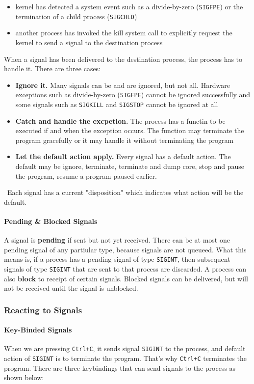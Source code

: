 \documentclass{article}
\newcommand{\bold}[1]{\textbf{#1}}
\renewcommand{\b}{\item[$\circ$]}
\newcommand{\newlist}{\begin{itemize}}
\renewcommand{\endlist}{\end{itemize}}
\newcommand{\code}[1]{\texttt{#1}}
\begin{document}
\newlist
\b kernel has detected a system event such as a divide-by-zero (\code{SIGFPE}) or the termination of a child process (\code{SIGCHLD})
\b another process has invoked the kill system call to explicitly request the kernel to send a signal to the destination process
\endlist

When a signal has been delivered to the destination process, the process has to handle it. There are three cases:

\newlist 
\b \bold{Ignore it.} Many signals can be and are ignored, but not all. Hardware exceptions such as divide-by-zero (\code{SIGFPE}) cannot be ignored successfully and some signals such as \code{SIGKILL} and \code{SIGSTOP} cannot be ignored at all
\b \bold{Catch and handle the excpetion.} The process has a functin to be executed if and when the exception occurs. The function may terminate the program gracefully or it may handle it without terminating the program
\b \bold{Let the default action apply.} Every signal has a default action. The default may be ignore, terminate, terminate and dump core, stop and pause the program, resume a program paused earlier.
\endlist

\ Each signal has a current "disposition" which indicates what action will be the default.

\paragraph{Pending \& Blocked Signals}

A signal is \bold{pending} if sent but not yet received. There can be at most one pending signal of any partiular type, because signals are not queueed. What this means is, if a process has a pending signal of type \code{SIGINT}, then subsequent signals of type \code{SIGINT} that are sent to that process are discarded. A process can also \bold{block} to receipt of certain signals. Blocked signals can be delivered, but will not be received until the signal is unblocked. 

\subsubsection{Reacting to Signals}

\paragraph{Key-Binded Signals}

When we are pressing \code{Ctrl+C}, it sends signal \code{SIGINT} to the process, and default action of \code{SIGINT} is to terminate the program. That's why \code{Ctrl+C} terminates the program. There are three keybindings that can send signals to the process as shown below:
\end{document}
